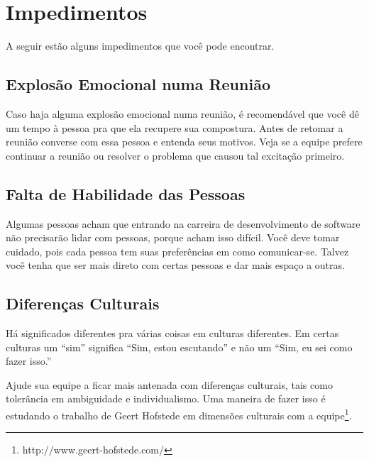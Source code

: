 \documentclass[a4paper, 10pt, font=plain]{abnt}
\begin{document}
\section{Impedimentos}
A seguir estão alguns impedimentos que você pode encontrar.

\subsection{Explosão Emocional numa Reunião}
Caso haja alguma explosão emocional numa reunião, é recomendável que você dê um tempo à pessoa pra que ela recupere sua compostura. Antes de retomar a reunião converse com essa pessoa e entenda seus motivos. Veja se a equipe prefere continuar a reunião ou resolver o problema que causou tal excitação primeiro.

\subsection{Falta de Habilidade das Pessoas}
Algumas pessoas acham que entrando na carreira de desenvolvimento de software não precisarão lidar com pessoas, porque acham isso difícil. Você deve tomar cuidado, pois cada pessoa tem suas preferências em como comunicar-se. Talvez você tenha que ser mais direto com certas pessoas e dar mais espaço a outras.

\subsection{Diferenças Culturais}
Há significados diferentes pra várias coisas em culturas diferentes. Em certas culturas um ``sim'' significa ``Sim, estou escutando'' e não um ``Sim, eu sei como fazer isso.''

Ajude sua equipe a ficar mais antenada com diferenças culturais, tais como tolerância em ambiguidade e individualismo. Uma maneira de fazer isso é estudando o trabalho de Geert Hofstede em dimensões culturais com a equipe\footnote{http://www.geert-hofstede.com/}.
\end{document}
